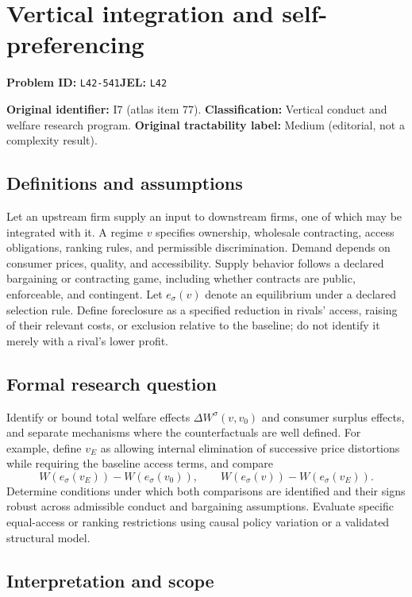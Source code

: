 \documentclass[11pt,a4paper]{article}
\begin{document}
\section*{Vertical integration and self-preferencing}
\textbf{Problem ID:} \texttt{L42-541}\quad \textbf{JEL:} \texttt{L42}\par
\label{problem:OP-0077}
\label{atlas:prob:I7}

\noindent\textbf{Original identifier:} I7 (atlas item 77). \textbf{Classification:} Vertical conduct and welfare research program. \textbf{Original tractability label:} Medium (editorial, not a complexity result).

\subsection*{Definitions and assumptions}

Let an upstream firm supply an input to downstream firms, one of which may be integrated with it. A regime $v$ specifies ownership, wholesale contracting, access obligations, ranking rules, and permissible discrimination. Demand depends on consumer prices, quality, and accessibility. Supply behavior follows a declared bargaining or contracting game, including whether contracts are public, enforceable, and contingent. Let $e_\sigma(v)$ denote an equilibrium under a declared selection rule. Define foreclosure as a specified reduction in rivals' access, raising of their relevant costs, or exclusion relative to the baseline; do not identify it merely with a rival's lower profit.

\subsection*{Formal research question}

Identify or bound total welfare effects $\Delta W^\sigma(v,v_0)$ and consumer surplus effects, and separate mechanisms where the counterfactuals are well defined. For example, define $v_E$ as allowing internal elimination of successive price distortions while requiring the baseline access terms, and compare
\[
W(e_\sigma(v_E))-W(e_\sigma(v_0)),\qquad
W(e_\sigma(v))-W(e_\sigma(v_E)).
\]
Determine conditions under which both comparisons are identified and their signs robust across admissible conduct and bargaining assumptions. Evaluate specific equal-access or ranking restrictions using causal policy variation or a validated structural model.

\subsection*{Interpretation and scope}
\end{document}
